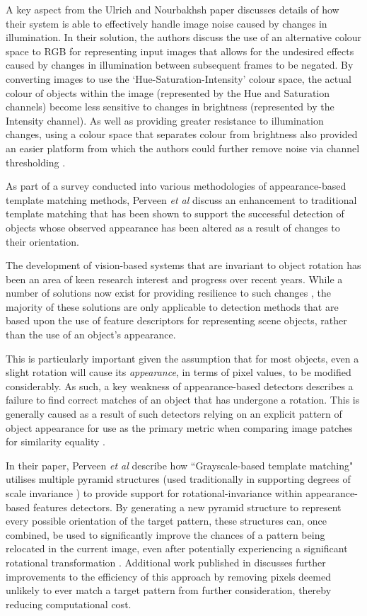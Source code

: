 A key aspect from the Ulrich and Nourbakhsh paper discusses details of how their system is able to effectively handle image noise caused by changes in illumination. In their solution, the authors discuss the use of an alternative colour space to RGB for representing input images that allows for the undesired effects caused by changes in illumination between subsequent frames to be negated. By converting images to use the `Hue-Saturation-Intensity' colour space, the actual colour of objects within the image (represented by the Hue and Saturation channels) become less sensitive to changes in brightness (represented by the Intensity channel). As well as providing greater resistance to illumination changes, using a colour space that separates colour from brightness also provided an easier platform from which the authors could further remove noise via channel thresholding \cite{ulrich-nourbakhsh}. 

As part of a survey conducted into various methodologies of appearance-based template matching methods, Perveen \textit{et al} \cite{perveen} discuss an enhancement to traditional template matching that has been shown to support the successful detection of objects whose observed appearance has been altered as a result of changes to their orientation. 

  The development of vision-based systems that are invariant to object rotation has been an area of keen research interest and progress over recent years. While a number of solutions now exist for providing resilience to such changes \cite{sift}, the majority of these solutions are only applicable to detection methods that are based upon the use of feature descriptors for representing scene objects, rather than the use of an object's appearance. 
  
  This is particularly important given the assumption that for most objects, even a slight rotation will cause its \textit{appearance}, in terms of pixel values, to be modified considerably. As such, a key weakness of appearance-based detectors describes a failure to find correct matches of an object that has undergone a rotation. This is generally caused as a result of such detectors relying on an explicit pattern of object appearance for use as the primary metric when comparing image patches for similarity equality \cite{find-citation}.
 
 In their paper, Perveen \textit{et al} describe how ``Grayscale-based template matching" utilises multiple pyramid structures (used traditionally in supporting degrees of scale invariance \cite{lowe}) to provide support for rotational-invariance within appearance-based features detectors. By generating a new pyramid structure to represent every possible orientation of the target pattern, these structures can, once combined, be used to significantly improve the chances of a pattern being relocated in the current image, even after potentially experiencing a significant rotational transformation \cite{perveen}. Additional work published in \cite{kim} discusses further improvements to the efficiency of this approach by removing pixels deemed unlikely to ever match a target pattern from further consideration, thereby reducing computational cost. 

